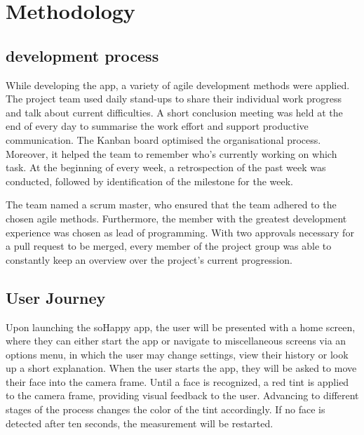 \section{Methodology} \label{sec:methodology}

\subsection{development process}

While developing the app, a variety of agile development methods were applied.
The project team used daily stand-ups to share their individual work progress and talk about current difficulties.
A short conclusion meeting was held at the end of every day to summarise the work effort and support productive communication.
The Kanban board optimised the organisational process. Moreover, it helped the team to remember who's currently working on which task.
At the beginning of every week, a retrospection of the past week was conducted, followed by identification of the milestone for the week.

The team named a scrum master, who ensured that the team adhered to the chosen agile methods. Furthermore, the member with the greatest development experience was chosen as lead of programming.
With two approvals necessary for a pull request to be merged, every member of the project group was able to constantly keep an overview over the project's current progression.

\subsection{User Journey} \label{sec:user_journey}

Upon launching the soHappy app, the user will be presented with a home screen, where they can either start the app or navigate to miscellaneous screens via an options menu, in which the user may change settings, view their history or look up a short explanation.
When the user starts the app, they will be asked to move their face into the camera frame. Until a face is recognized, a red tint is applied to the camera frame, providing visual feedback to the user. Advancing to different stages of the process changes the color of the tint accordingly. If no face is detected after ten seconds, the measurement will be restarted.

